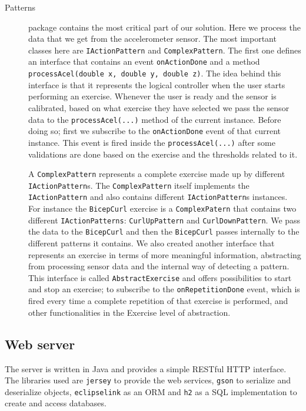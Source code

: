 \documentclass{tk3-team}
\begin{document}
\begin{description}
\item[Patterns] package contains the most critical part of our solution. Here we process the data that we get from the accelerometer sensor. The most important classes here are \texttt{IActionPattern} and \texttt{ComplexPattern}. The first one defines an interface that contains an event \texttt{onActionDone} and a method \texttt{processAcel(double x, double y, double z)}. The idea behind this interface is that it represents the logical controller when the user starts performing an exercise. Whenever the user is ready and the sensor is calibrated, based on what exercise they have selected we pass the sensor data to the \texttt{processAcel(...)} method of the current instance. Before doing so; first we subscribe to the \texttt{onActionDone} event of that current instance. This event is fired inside the \texttt{processAcel(...)} after some validations are done based on the exercise and the thresholds related to it.

A \texttt{ComplexPattern} represents a complete exercise made up by different \texttt{IActionPattern}s. The \texttt{ComplexPattern} itself implements the \texttt{IActionPattern} and also contains different \texttt{IActionPattern}s instances. For instance the \texttt{BicepCurl} exercise is a \texttt{ComplexPatern} that contains two different \texttt{IActionPatterns}: \texttt{CurlUpPattern} and \texttt{CurlDownPattern}. We pass the data to the \texttt{BicepCurl} and then the \texttt{BicepCurl} passes internally to the different patterns it contains. We also created another interface that represents an exercise in terms of more meaningful information, abstracting from processing sensor data and the internal way of detecting a pattern. This interface is called \texttt{AbstractExercise} and offers possibilities to start and stop an exercise; to subscribe to the \texttt{onRepetitionDone} event, which is fired every time a complete repetition of that exercise is performed, and other functionalities in the Exercise level of abstraction.
\end{description}

\subsection{Web server}

The server is written in Java and provides a simple RESTful HTTP interface. The libraries used are \texttt{jersey} to provide the web services, \texttt{gson} to serialize and deserialize objects, \texttt{eclipselink} as an ORM and \texttt{h2} as a SQL implementation to create and access databases.
\end{document}
